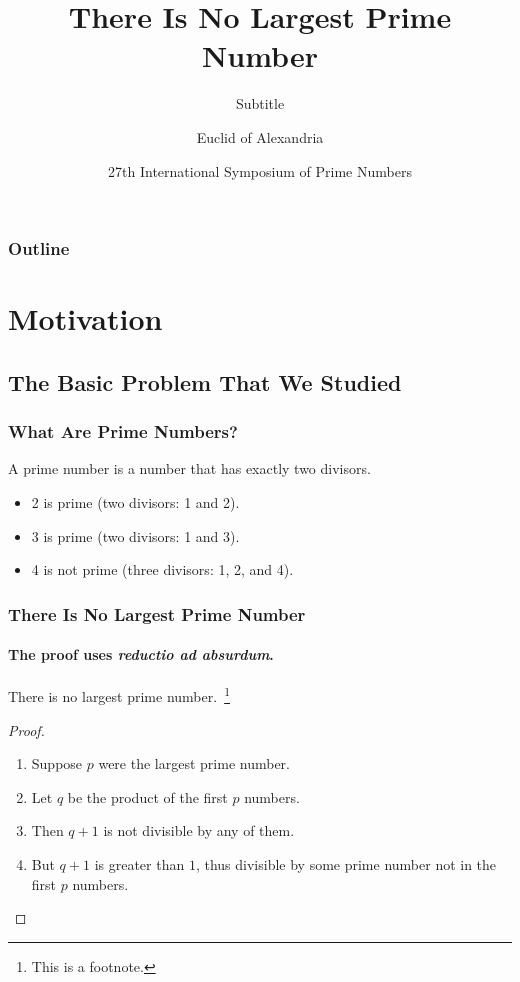 \documentclass[
]{beamer}
\title{There Is No Largest Prime Number}
\subtitle{Subtitle}
\author{Euclid of Alexandria}
\date{27th International Symposium of Prime Numbers}
\begin{document}
\begin{frame}
\titlepage
\end{frame}

\begin{frame}
\frametitle{Outline}
\tableofcontents
\end{frame}

\section{Motivation}
\subsection{The Basic Problem That We Studied}

\begin{frame}
\frametitle{What Are Prime Numbers?}
\begin{definition}
  A \alert{prime number} is a number that has exactly two divisors.
\end{definition}
\begin{example}
  \begin{itemize}
    \item 2 is prime (two divisors: 1 and 2).
      \pause
    \item 3 is prime (two divisors: 1 and 3).
      \pause
    \item 4 is not prime (\alert{three} divisors: 1, 2, and 4).
  \end{itemize}
\end{example}
\end{frame}

\begin{frame}[t]
\frametitle{There Is No Largest Prime Number}
\framesubtitle{The proof uses \textit{reductio ad absurdum}.}
\begin{theorem}[c. 300 BC]
  There is no largest prime number.~\footnote{This is a footnote.}
\end{theorem}
\begin{proof}
  \begin{enumerate}
    \item<1-> Suppose $p$ were the largest prime number.
    \item<2-> Let $q$ be the product of the first $p$ numbers.
    \item<3-> Then $q + 1$ is not divisible by any of them.
    \item<1-> But $q + 1$ is greater than $1$, thus divisible by some prime
      number not in the first $p$ numbers.\qedhere
  \end{enumerate}
\end{proof}
\end{frame}
\end{document}
